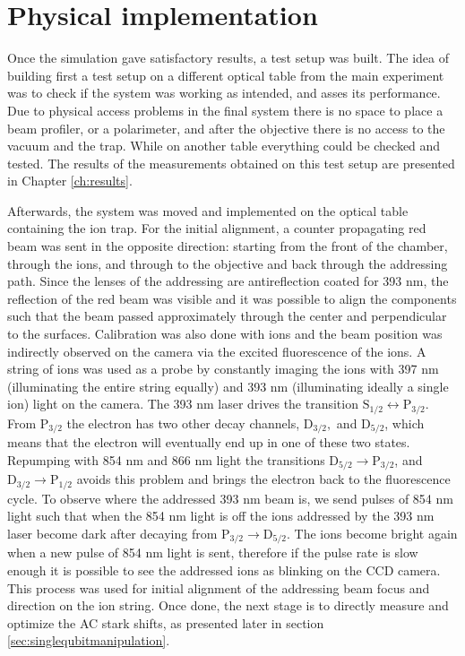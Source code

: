 \section{Physical implementation}
\label{design4}
Once the simulation gave satisfactory results, a test setup was built. The idea of building first a test setup on a different optical table from the main experiment was to check if the system was working as intended, and asses its performance. Due to physical access problems in the final system there is no space to place a beam profiler, or a polarimeter, and after the objective there is no access to the vacuum and the trap. While on another table everything could be checked and tested. The results of the measurements obtained on this test setup are presented in Chapter \ref{ch:results}.\par
Afterwards, the system was moved and implemented on the optical table containing the ion trap. For the initial alignment, a counter propagating red beam was sent in the opposite direction: starting from the front of the chamber, through the ions, and through to the objective and back through the addressing path. Since the lenses of the addressing are antireflection coated for 393 nm, the reflection of the red beam was visible and it was possible to align the components such that the beam passed approximately through the center and perpendicular to the surfaces. Calibration was also done with ions and the beam position was indirectly observed on the camera via the excited fluorescence of the ions. A string of ions was used as a probe by constantly imaging the ions with 397 nm (illuminating the entire string equally) and 393 nm (illuminating ideally a single ion) light on the camera. The 393 nm laser drives the transition $\text{S}_{1/2}\leftrightarrow \text{P}_{3/2}$. From $\text{P}_{3/2}$ the electron has two other decay channels, $\text{D}_{3/2},$ and $\text{D}_{5/2}$, which means that the electron will eventually end up in one of these two states. Repumping with 854 nm and 866 nm light the transitions $\text{D}_{5/2}\to \text{P}_{3/2}$, and $\text{D}_{3/2}\to \text{P}_{1/2}$ avoids this problem and brings the electron back to the fluorescence cycle. To observe where the addressed 393 nm beam is, we send pulses of 854 nm light
such that when the 854 nm light is off the ions addressed by the 393 nm laser become dark after decaying from $\text{P}_{3/2}\to  \text{D}_{5/2}$. The ions become bright again when a new pulse of 854 nm light is sent, therefore if the pulse rate is slow enough it is possible to see the addressed ions as blinking on the CCD camera. This process was used for initial alignment of the addressing beam focus and direction on the ion string. Once done, the next stage is to directly measure and optimize the AC stark shifts, as presented later in section \ref{sec:singlequbitmanipulation}.\par
